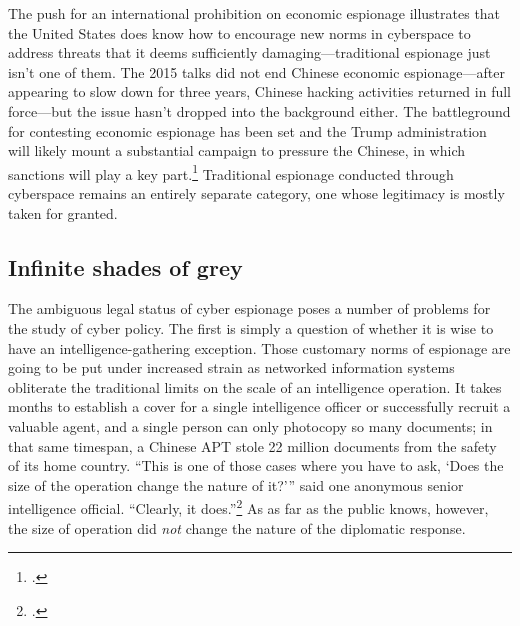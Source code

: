 \documentclass[11pt]{memoir}
\begin{document}
\begin{refsegment}
The push for an international prohibition on economic espionage illustrates that the United States does know how to encourage new norms in cyberspace to address threats that it deems sufficiently damaging---traditional espionage just isn't one of them.  The 2015 talks did not end Chinese economic espionage---after appearing to slow down for three years, Chinese hacking activities returned in full force---but the issue hasn't dropped into the background either. The battleground for contesting economic espionage has been set and the Trump administration will likely mount a substantial campaign to pressure the Chinese, in which sanctions will play a key part.\footcite{laskai_new_2018} Traditional espionage conducted through cyberspace remains an entirely separate category, one whose legitimacy is mostly taken for granted.

\subsection{Infinite shades of grey}
The ambiguous legal status of cyber espionage poses a number of problems for the study of cyber policy. The first is simply a question of whether it is wise to have an intelligence-gathering exception. Those customary norms of espionage are going to be put under increased strain as networked information systems obliterate the traditional limits on the scale of an intelligence operation. It takes months to establish a cover for a single intelligence officer or successfully recruit a valuable agent, and a single person can only photocopy so many documents; in that same timespan, a Chinese APT stole 22 million documents from the safety of its home country. ``This is one of those cases where you have to ask, `Does the size of the operation change the nature of it?'\thinspace'' said one anonymous senior intelligence official. ``Clearly, it does.''\footcite{sanger_u.s._2015} As as far as the public knows, however, the size of operation did \emph{not} change the nature of the diplomatic response.


\end{refsegment}
\end{document}
